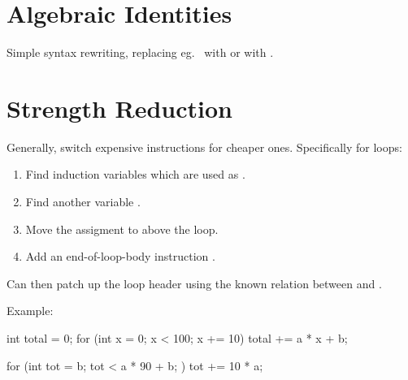 \documentclass[a4paper, 11pt]{article}
\begin{document}
\section*{Algebraic Identities}
{
    Simple syntax rewriting, replacing eg.\  with  or \monospace{[1,2] ++ [3,4]} with \monospace{[1,2,3,4]}.
}
\section*{Strength Reduction}
{
    Generally, switch expensive instructions for cheaper ones. Specifically for loops:

    \begin{enumerate}
    \item Find induction variables which are used as .
    \item Find another variable .
    \item Move the assigment  to above the loop.
    \item Add an end-of-loop-body instruction .
    \end{enumerate}

    Can then patch up the loop header using the known relation between  and .

    Example:

    \begin{minipage}[t]{0.45\textwidth}
    \begin{monospacefigure}
    int total = 0;
    for (int x = 0; x < 100; x += 10)
        total += a * x + b;
    \end{monospacefigure}
    \end{minipage}
    \hspace{5mm}
    \begin{minipage}[t]{0.45\textwidth}
    \begin{monospacefigure}
    for (int tot = b; tot < a * 90 + b; )
        tot += 10 * a;
    \end{monospacefigure}
    \end{minipage}
}
\end{document}
